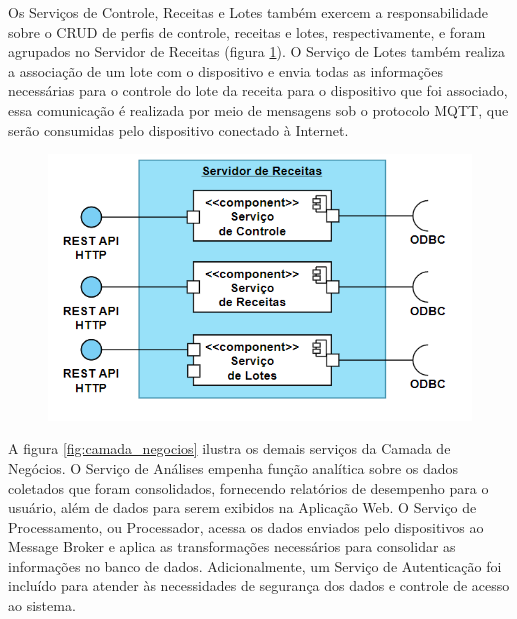 Os Serviços de Controle, Receitas e Lotes também exercem a responsabilidade sobre o CRUD de perfis de controle, receitas e lotes, respectivamente, e foram agrupados no Servidor de Receitas (figura \ref{fig:camada_negocios_receita}). O Serviço de Lotes também realiza a associação de um lote com o dispositivo e envia todas as informações necessárias para o controle do lote da receita para o dispositivo que foi associado, essa comunicação é realizada por meio de mensagens sob o protocolo MQTT, que serão consumidas pelo dispositivo conectado à Internet.

\begin{figure}[h]
    \centering
    \includegraphics[scale=0.50]{figuras/projeto/software/camada_negocios_receita.PNG}
    \label{fig:camada_negocios_receita}
\end{figure}

A figura \ref{fig:camada_negocios} ilustra os demais serviços da Camada de Negócios. O Serviço de Análises empenha função analítica sobre os dados coletados que foram consolidados, fornecendo relatórios de desempenho para o usuário, além de dados para serem exibidos na Aplicação Web. O Serviço de Processamento, ou Processador, acessa os dados enviados pelo dispositivos ao Message Broker e aplica as transformações necessários para consolidar as informações no banco de dados. Adicionalmente, um Serviço de Autenticação foi incluído para atender às necessidades de segurança dos dados e controle de acesso ao sistema.
    
